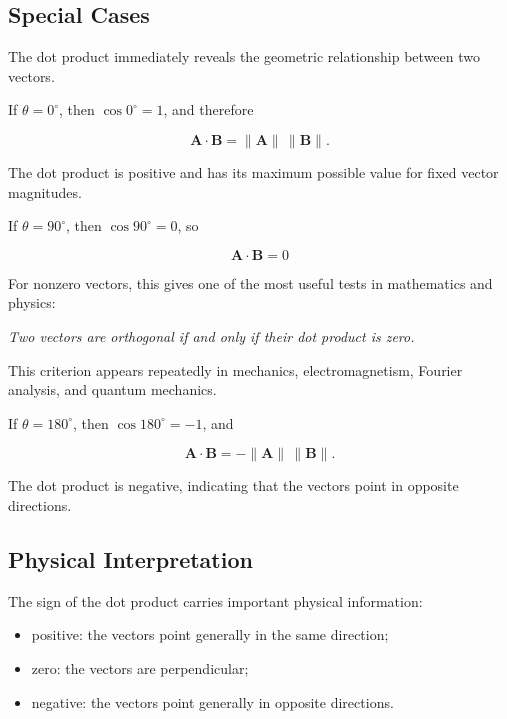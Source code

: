 \subsection{Special Cases}

The dot product immediately reveals the geometric relationship between two
vectors.


If $\theta=0^{\circ}$, then $\cos 0^{\circ}=1$, and therefore

\[
\mathbf A\cdot\mathbf B
=
\lVert\mathbf A\rVert\,\lVert\mathbf B\rVert.
\]

The dot product is positive and has its maximum possible value for fixed vector
magnitudes.


If $\theta=90^{\circ}$, then $\cos 90^{\circ}=0$, so

\[
\boxed{
\mathbf A\cdot\mathbf B=0
}
\]

For nonzero vectors, this gives one of the most useful tests in mathematics and
physics:

\begin{center}
\emph{Two vectors are orthogonal if and only if their dot product is zero.}
\end{center}

This criterion appears repeatedly in mechanics, electromagnetism, Fourier
analysis, and quantum mechanics.


If $\theta=180^{\circ}$, then $\cos 180^{\circ}=-1$, and

\[
\mathbf A\cdot\mathbf B
=-\lVert\mathbf A\rVert\,\lVert\mathbf B\rVert.
\]

The dot product is negative, indicating that the vectors point in opposite
directions.

\subsection{Physical Interpretation}

The sign of the dot product carries important physical information:

\begin{itemize}
  \item positive: the vectors point generally in the same direction;
  \item zero: the vectors are perpendicular;
  \item negative: the vectors point generally in opposite directions.
\end{itemize}

